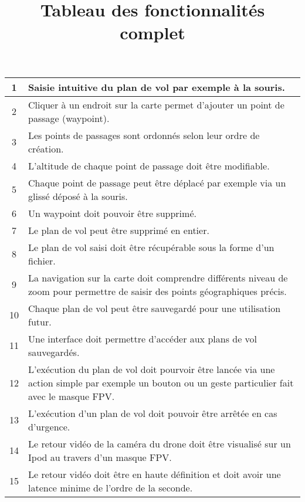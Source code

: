 \documentclass{article}
\date{}
\title{Tableau des fonctionnalités complet}
\begin{document}
\maketitle

\renewcommand{\arraystretch}{1.75}
\begin{center}
\begin{tabularx}{\linewidth}{|c|X|}
	\hline
	1 & Saisie intuitive du plan de vol par exemple à la souris.\\
	\hline
	2 & Cliquer à un endroit sur la carte permet d'ajouter un point de passage (waypoint).\\
	\hline
	3 & Les points de passages sont ordonnés selon leur ordre de création.\\
	\hline
	4 & L'altitude de chaque point de passage doit être modifiable.\\
	\hline
	5 & Chaque point de passage peut être déplacé par exemple via un glissé déposé à la souris.\\
	\hline
	6 & Un waypoint doit pouvoir être supprimé.\\
	\hline
	7 & Le plan de vol peut être supprimé en entier.\\
	\hline
	8 & Le plan de vol saisi doit être récupérable sous la forme d'un fichier.\\
	\hline
	9 & La navigation sur la carte doit comprendre différents niveau de zoom pour permettre de saisir des points géographiques précis.\\
	\hline
	10 & Chaque plan de vol peut être sauvegardé pour une utilisation futur.\\
	\hline
	11 & Une interface doit permettre d'accéder aux plans de vol sauvegardés.\\
	\hline
	12 & L'exécution du plan de vol doit pourvoir être lancée via une action simple par exemple un bouton ou un geste particulier fait avec le masque FPV.\\
	\hline
	13 & L'exécution d'un plan de vol doit pouvoir être arrêtée en cas d'urgence.\\
	\hline
	14 & Le retour vidéo de la caméra du drone doit être visualisé sur un Ipod au travers d'un masque FPV.\\
	\hline
	15 & Le retour vidéo doit être en haute définition et doit avoir une latence minime de l'ordre de la seconde.\\
	\hline
\end{tabularx}
\end{center}
\end{document}

